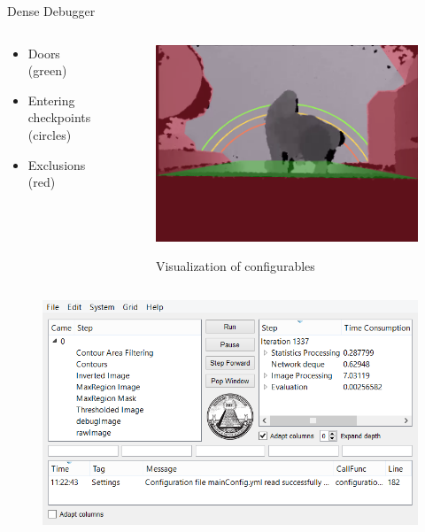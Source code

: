 \documentclass[final,hyperref={pdfpagelabels=false}]{beamer}
\begin{document}
\begin{frame}[t]
\begin{columns}[t]
\begin{column}{.465\textwidth}
\begin{block}{Dense Debugger}
\begin{columns}
\begin{column}{.54\textwidth}
\begin{itemize}
\begin{itemize}
\item Doors (green)
\item Entering checkpoints (circles)
\item Exclusions (red)
\end{itemize}
\end{itemize}

\end{column}

\begin{column}{.43\textwidth} %
\centering
\begin{figure}
\includegraphics[width=\linewidth]{PosterConfigCrop.png}
\label{fig:Config}
\caption{Visualization of configurables}
\end{figure}
\end{column}
\end{columns} %

\begin{figure}
\includegraphics[width=0.8\linewidth]{PosterDebuggerCrop.png}
\caption{}
\end{figure}


\end{block}
\end{column}
\end{columns}
\end{frame}
\end{document}
